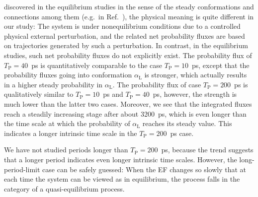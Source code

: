 \documentclass[journal=jctcce,manuscript=manuscript]{achemso}
\newcommand{\period}[0]{T_{\textrm{P}}}
\newcommand{\confc}[0]{{\alpha_{\textrm{L}}}}
\begin{document}
  discovered in the equilibrium studies 
  in the sense of the steady conformations and connections among them (e.g.~in Ref.~\cite{apostolakis1999calculation, gfeller2007complex}),
  the physical meaning is quite different in our study:
  The system is under nonequilibrium conditions due to a controlled physical external perturbation, and
  the related net probability fluxes are based on trajectories generated by such a perturbation. In contrast, in the equilibrium studies,
  such net probability fluxes do not explicitly exist.
The probability flux of $\period =40$~ps is quantitatively
comparable to the case $\period =10$~ps, except that the probability fluxes
going into conformation $\confc$ is stronger, which actually results in
a higher steady probability in $\confc$.
The probability flux of case $\period =200$~ps is qualitatively
similar to $\period =10$~ps and $\period =40$~ps, however,
the strength is much lower than the latter two cases.
Moreover, 
  we see that the integrated fluxes reach
  a steadily
increasing stage after about 3200~ps, which is even longer than the time scale
at which the probability of $\confc$ reaches its steady value. This indicates
a longer intrinsic time scale in the $\period =200$~ps case.

We have not studied periods longer than $\period =200$~ps, because
the trend suggests that a longer period indicates even longer intrinsic time scales.
However, the long-period-limit case can be safely guessed: When
the EF changes so slowly that
at each time the system
can be viewed as in equilibrium,
the process falls in the category of a quasi-equilibrium
process. 
\end{document}
